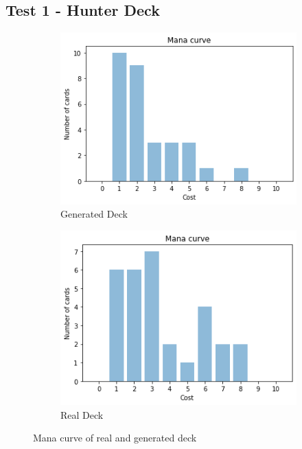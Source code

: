 \documentclass{report} %
\begin{document}
\subsection{Test 1 - Hunter Deck}
\begin{figure}[H]
\centering
\begin{subfigure}{.5\textwidth}
  \centering
  \includegraphics[width=.75\linewidth]{TestImages/HunterDeckManaCurveFake}
  \caption{Generated Deck}
\end{subfigure}%
\begin{subfigure}{.5\textwidth}
  \centering
  \includegraphics[width=.75\linewidth]{TestImages/HunterDeckManaCurveReal}
  \caption{Real Deck}
\end{subfigure}
\caption{Mana curve of real and generated deck}
\end{figure}
\end{document}
